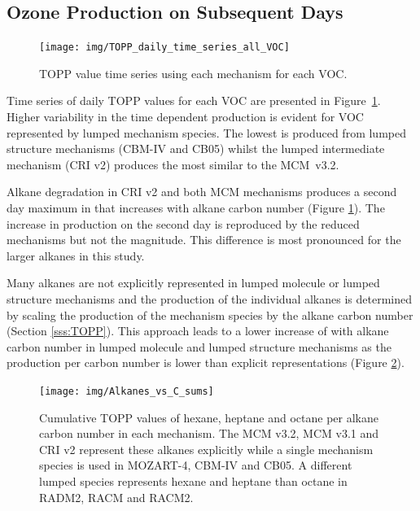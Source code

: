 \subsection{Ozone Production on Subsequent Days} \label{ss:profiles} %

\begin{figure}
    \centering
    \texttt{[image: img/TOPP\_daily\_time\_series\_all\_VOC]}
    \vspace{0mm}
    \caption{TOPP value time series using each mechanism for each VOC.}
    \vspace{-4mm}
    \label{f:TOPP_dailies}
\end{figure}

Time series of daily TOPP values for each VOC are presented in \mbox{Figure \ref{f:TOPP_dailies}}. 
Higher variability in the time dependent  production is evident for VOC represented by lumped mechanism species.
The lowest  is produced from lumped structure mechanisms (CBM-IV and CB05) whilst the lumped intermediate mechanism (CRI v2) produces the most similar  to the \mbox{MCM v3.2}.

Alkane degradation in CRI v2 and both MCM mechanisms produces a second day maximum in  that increases with alkane carbon number (Figure \ref{f:TOPP_dailies}).
The increase in  production on the second day is reproduced by the reduced mechanisms but not the magnitude.
This difference is most pronounced for the larger alkanes in this study.

Many alkanes are not explicitly represented in lumped molecule or lumped structure mechanisms and the  production of the individual alkanes is determined by scaling the  production of the mechanism species by the alkane carbon number (Section \ref{sss:TOPP}).
This approach leads to a lower increase of  with alkane carbon number in lumped molecule and lumped structure mechanisms as the  production per carbon number is lower than explicit representations (Figure \ref{f:alkane_C}).

\begin{figure}
    \centering
    \texttt{[image: img/Alkanes\_vs\_C\_sums]}
    \vspace{0mm}
    \caption{Cumulative TOPP values of hexane, heptane and octane per alkane carbon number in each mechanism. The MCM v3.2, MCM v3.1 and CRI v2 represent these alkanes explicitly while a single mechanism species is used in MOZART-4, CBM-IV and CB05. A different lumped species represents hexane and heptane than octane in RADM2, RACM and RACM2.}
    \vspace{-4mm}
    \label{f:alkane_C}
\end{figure}

